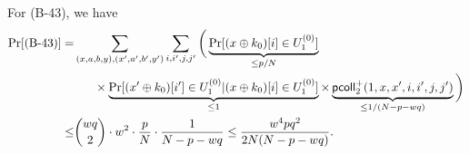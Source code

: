 For (B-43), we have          {\small
%
%
\begin{align*}
\Pr[\text{(B-43)}]  
=   &  \sum_{(x,a,b,y),(x',a',b',y')}\sum_{i,i',j,j'}\bigg(\underbrace{\Pr[(x\xor k_0)[i]\in U_1^{(0)}]}_{\leq p/N}     \\
   & \midindent\times
	\underbrace{\Pr[(x'\xor k_0)[i']\in U_1^{(0)}|(x\xor k_0)[i]\in U_1^{(0)}]}_{\leq1}\times\underbrace{\pcoll_2^+(1,x,x',i,i',j,j')}_{\leq1/(N-p-wq)}\bigg)      \\
\leq  &   {wq\choose 2}\cdot w^2\cdot\frac{p}{N}\cdot\frac{1}{N-p-wq}\leq
\frac{w^4pq^2}{2N(N-p-wq)}.
%
\end{align*}
}%
%





